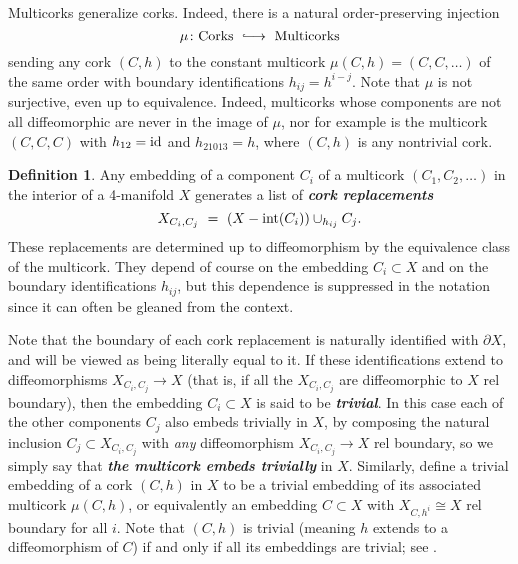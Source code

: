 \documentclass[11pt]{amsart}
\theoremstyle{definition}
\newtheorem{definition}[theorem]{Definition}
\newcommand{\bit}[1]{\textbf{\textit{#1}}} %
\newcommand{\id}{\textup{id}}
\newcommand{\lhto}{\ \lhook\joinrel\relbar\joinrel\rightarrow \ }
\newcommand{\del}{\partial}
\newcommand{\interior}{\textup{int}}
\begin{document}
Multicorks generalize corks.  Indeed, there is a natural order-preserving injection 
$$
\mu\colon\text{Corks} \lhto \text{Multicorks}
$$
sending any cork $(C,h)$ to the constant multicork $\mu(C,h) = (C,C,\dots)$ of the same order
with boundary identifications $h_{ij} = h^{i-j}$.  Note that $\mu$ is not surjective, even up to equivalence.  Indeed, multicorks whose components are not all diffeomorphic are never in the image of $\mu$, nor for example is the multicork $(C,C,C)$ with $h_{12}=\id$ and $h_{21013}=h$, where $(C,h)$ is any nontrivial cork. 



\begin{definition}\label{corkreplacements}
Any embedding of a component $C_i$ of a multicork $(C_1,C_2,\dots)$ in the interior of a 4-manifold $X$ generates a list of \bit{cork replacements} 
$$
X_{C_i,C_j} \ = \ (X-\interior(C_i))\cup_{h_{ij}} C_j.
$$
These replacements are determined up to diffeomorphism by the equivalence class of the multicork.  They depend of course on the embedding $C_i\subset X$ and on the boundary identifications $h_{ij}$, but this dependence is suppressed in the notation since it can often be gleaned from the context.  

Note that the boundary of each cork replacement is naturally identified with $\del X$, and will be viewed as being literally equal to it.  If these identifications extend to diffeomorphisms $X_{C_i,C_j}\to X$ (that is, if all the $X_{C_i,C_j}$ are diffeomorphic to $X$ rel boundary), then the embedding $C_i\subset X$ is said to be \bit{trivial}.  In this case each of the other components $C_j$ also embeds trivially in $X$, by composing the natural inclusion $C_j\subset X_{C_i,C_j}$ with {\sl any} diffeomorphism $X_{C_i,C_j}\to X$ rel boundary, so we simply say that \bit{the multicork embeds trivially} in $X$.   Similarly, define a trivial embedding of a cork $(C,h)$ in $X$ to be a trivial embedding of its associated multicork $\mu(C,h)$, or equivalently an embedding $C\subset X$ with $X_{C,h^i} \cong X$ rel boundary for all $i$.  Note that $(C,h)$ is trivial (meaning $h$ extends to a diffeomorphism of $C$) if and only if all its embeddings are trivial; see \cite[\S1]{akmr:equivariant}.
\end{definition}  
\end{document}
